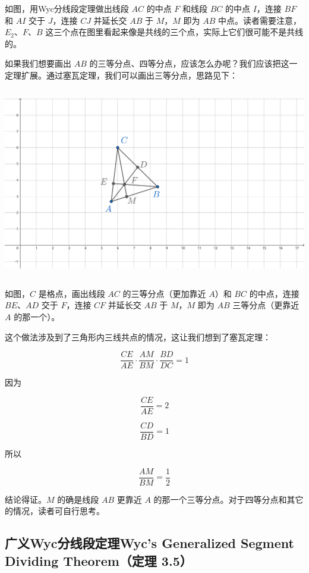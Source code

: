 \documentclass[UTF8]{article}
\begin{document}
如图，用Wyc分线段定理做出线段 \(AC\) 的中点 \(F\) 和线段 \(BC\) 的中点
\(I\)，连接 \(BF\) 和 \(AI\) 交于 \(J\)，连接 \(CJ\) 并延长交 \(AB\) 于
\(M\)，\(M\) 即为 \(AB\) 中点。读者需要注意，\(E_{2}\)、\(F\)、\(B\)
这三个点在图里看起来像是共线的三个点，实际上它们很可能不是共线的。

如果我们想要画出 \(AB\)
的三等分点、四等分点，应该怎么办呢？我们应该把这一定理扩展。通过塞瓦定理，我们可以画出三等分点，思路见下：

\includegraphics[width=5.76806in,height=3.27847in]{media/image26.png}

如图，\(C\) 是格点，画出线段 \(AC\) 的三等分点（更加靠近 \(A\)）和
\(BC\) 的中点，连接 \(BE\)、\(AD\) 交于 \(F\)，连接 \(CF\) 并延长交
\(AB\) 于 \(M\)，\(M\) 即为 \(AB\) 三等分点（更靠近 \(A\) 的那一个）。

这个做法涉及到了三角形内三线共点的情况，这让我们想到了塞瓦定理：

\[\frac{CE}{AE} \cdot \frac{AM}{BM} \cdot \frac{BD}{DC} = 1\]

因为

\[\frac{CE}{AE} = 2\]

\[\frac{CD}{BD} = 1\]

所以

\[\frac{AM}{BM} = \frac{1}{2}\]

结论得证。\(M\) 的确是线段 \(AB\) 更靠近 \(A\)
的那一个三等分点。对于四等分点和其它的情况，读者可自行思考。

\hypertarget{ux5e7fux4e49wycux5206ux7ebfux6bb5ux5b9aux7406wycs-generalized-segment-dividing-theoremux5b9aux7406-3.5}{%
\subsection{广义Wyc分线段定理Wyc's Generalized Segment Dividing
Theorem（定理
3.5）}\label{ux5e7fux4e49wycux5206ux7ebfux6bb5ux5b9aux7406wycs-generalized-segment-dividing-theoremux5b9aux7406-3.5}}
\end{document}
